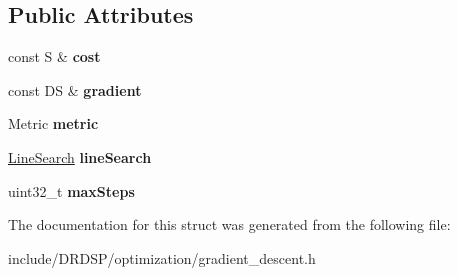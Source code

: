 \subsection*{Public Attributes}
\begin{DoxyCompactItemize}
\item 
\hypertarget{struct_d_r_d_s_p_1_1_gradient_descent_ae37db7d5f8203c9636421950402012ee}{const S \& {\bfseries cost}}\label{struct_d_r_d_s_p_1_1_gradient_descent_ae37db7d5f8203c9636421950402012ee}

\item 
\hypertarget{struct_d_r_d_s_p_1_1_gradient_descent_a27e280693a2ea49c5978a9fbec467384}{const D\-S \& {\bfseries gradient}}\label{struct_d_r_d_s_p_1_1_gradient_descent_a27e280693a2ea49c5978a9fbec467384}

\item 
\hypertarget{struct_d_r_d_s_p_1_1_gradient_descent_a9f52cc0847b60f167b8b7dcdbc15c211}{Metric {\bfseries metric}}\label{struct_d_r_d_s_p_1_1_gradient_descent_a9f52cc0847b60f167b8b7dcdbc15c211}

\item 
\hypertarget{struct_d_r_d_s_p_1_1_gradient_descent_a64f328d922bca75d2cd7581c380c50f0}{\hyperlink{struct_d_r_d_s_p_1_1_line_search}{Line\-Search} {\bfseries line\-Search}}\label{struct_d_r_d_s_p_1_1_gradient_descent_a64f328d922bca75d2cd7581c380c50f0}

\item 
\hypertarget{struct_d_r_d_s_p_1_1_gradient_descent_a7ba95b5390365497175372184f0d6b5c}{uint32\-\_\-t {\bfseries max\-Steps}}\label{struct_d_r_d_s_p_1_1_gradient_descent_a7ba95b5390365497175372184f0d6b5c}

\end{DoxyCompactItemize}


The documentation for this struct was generated from the following file\-:\begin{DoxyCompactItemize}
\item 
include/\-D\-R\-D\-S\-P/optimization/gradient\-\_\-descent.\-h\end{DoxyCompactItemize}
